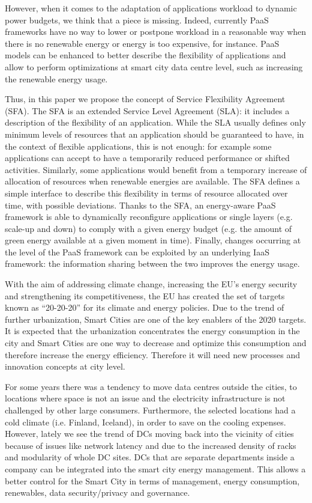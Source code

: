 However, when it comes to the adaptation of applications workload to dynamic power budgets, we think that a piece is missing.
Indeed, currently PaaS frameworks have no way to lower or postpone workload in a reasonable way when there is no renewable energy or energy is too expensive, for instance.
PaaS models can be enhanced to better describe the flexibility of applications and allow to perform optimizations at smart city data centre level, such as increasing the renewable energy usage.

Thus, in this paper we propose the concept of Service Flexibility Agreement (SFA). 
The SFA is an extended Service Level Agreement (SLA): it includes a description of the flexibility of an application.
While the SLA usually defines only minimum levels of resources that an application should be guaranteed to have, in the context of flexible applications, this is not enough: for example some applications can accept to have a temporarily reduced performance or shifted activities.
Similarly, some applications would benefit from a temporary increase of allocation of resources when renewable energies are available.
The SFA defines a simple interface to describe this flexibility in terms of resource allocated over time, with possible deviations. 
Thanks to the SFA, an energy-aware PaaS framework is able to dynamically reconfigure applications or single layers (e.g. scale-up and down) to comply with a given energy budget (e.g. the amount of green energy available at a given moment in time).
Finally, changes occurring at the level of the PaaS framework can be exploited by an underlying IaaS framework: the information sharing between the two improves the energy usage.

With the aim of addressing climate change, increasing the EU’s energy security and strengthening its competitiveness, the EU has created the set of targets known as “20-20-20” for its climate and energy policies. Due to the trend of further urbanization, Smart Cities are one of the key enablers of the 2020 targets. It is expected that the urbanization concentrates the energy consumption in the city and Smart Cities are one way to decrease and optimize this consumption and therefore increase the energy efficiency. Therefore it will need new processes and innovation concepts at city level.

For some years there was a tendency to move data centres outside the cities, to locations where space is not an issue and the electricity infrastructure is not challenged by other large consumers. Furthermore, the selected locations had a cold climate (i.e. Finland, Iceland), in order to save on the cooling expenses. However, lately we see the trend of DCs moving back into the vicinity of cities because of issues like network latency and due to the increased density of racks and modularity of whole DC sites. DCs that are separate departments inside a company can be integrated into the smart city energy management. This allows a better control for the Smart City in terms of management, energy consumption, renewables, data security/privacy and governance.

